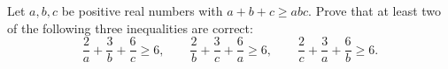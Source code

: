 Let $a,b,c$ be positive real numbers with $a+b+c \geq abc$. Prove that
at least two of the following three inequalities are correct:
$$\frac{2}{a}+\frac{3}{b}+\frac{6}{c} \geq 6, \qquad \frac{2}{b}+\frac{3}{c}+\frac{6}{a} \geq 6,
\qquad \frac{2}{c}+\frac{3}{a}+\frac{6}{b} \geq 6.$$
